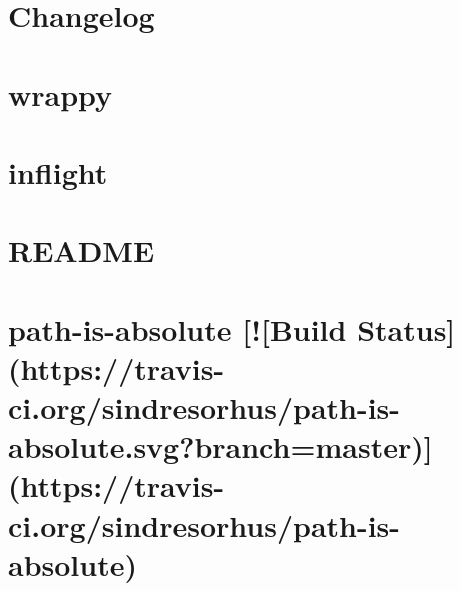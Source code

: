 \documentclass[twoside]{book}
\newcommand{\+}{\discretionary{\mbox{\scriptsize$\hookleftarrow$}}{}{}}
\begin{document}
\chapter{Changelog}
\label{md__c_1__users_martin__documents__git_hub_visual_studio__bachelor__wis_r__wis_r_node_modules_ist2474c422ed89beef532415580769a9f8}
\hypertarget{md__c_1__users_martin__documents__git_hub_visual_studio__bachelor__wis_r__wis_r_node_modules_ist2474c422ed89beef532415580769a9f8}{}

\chapter{wrappy}
\label{md__c_1__users_martin__documents__git_hub_visual_studio__bachelor__wis_r__wis_r_node_modules_ist0d2d54767f4875ed61ae345dcba3b7c7}
\hypertarget{md__c_1__users_martin__documents__git_hub_visual_studio__bachelor__wis_r__wis_r_node_modules_ist0d2d54767f4875ed61ae345dcba3b7c7}{}

\chapter{inflight}
\label{md__c_1__users_martin__documents__git_hub_visual_studio__bachelor__wis_r__wis_r_node_modules_istf95a5a1b311780ea57ade014d837fe33}
\hypertarget{md__c_1__users_martin__documents__git_hub_visual_studio__bachelor__wis_r__wis_r_node_modules_istf95a5a1b311780ea57ade014d837fe33}{}

\chapter{R\+E\+A\+D\+M\+E}
\label{md__c_1__users_martin__documents__git_hub_visual_studio__bachelor__wis_r__wis_r_node_modules_ist5f877593afd833775ef46e12291af753}
\hypertarget{md__c_1__users_martin__documents__git_hub_visual_studio__bachelor__wis_r__wis_r_node_modules_ist5f877593afd833775ef46e12291af753}{}

\chapter{path-\/is-\/absolute \mbox{[}!\mbox{[}Build Status\mbox{]}(https\+://travis-\/ci.org/sindresorhus/path-\/is-\/absolute.svg?branch=master)\mbox{]}(https\+://travis-\/ci.org/sindresorhus/path-\/is-\/absolute)}
\label{md__c_1__users_martin__documents__git_hub_visual_studio__bachelor__wis_r__wis_r_node_modules_ist7e0fed340211cb25ad59730afb1c2e6a}
\hypertarget{md__c_1__users_martin__documents__git_hub_visual_studio__bachelor__wis_r__wis_r_node_modules_ist7e0fed340211cb25ad59730afb1c2e6a}{}

\end{document}
